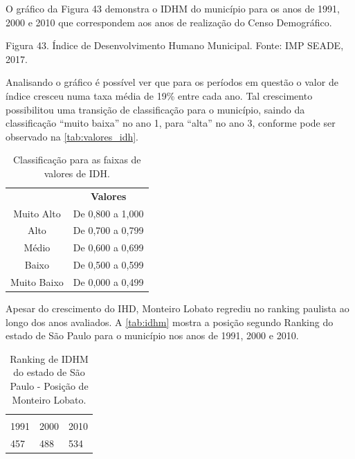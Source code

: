 O gráfico da Figura 43 demonstra o IDHM do município para os anos de 1991, 2000 e 2010 que correspondem aos anos de realização do Censo Demográfico.
 
Figura 43. Índice de Desenvolvimento Humano Municipal.
Fonte: IMP SEADE, 2017.

Analisando o gráfico é possível ver que para os períodos em questão o valor de índice cresceu numa taxa média de 19\% entre cada ano. Tal crescimento possibilitou uma transição de classificação para o município, saindo da classificação “muito baixa” no ano 1, para “alta” no ano 3, conforme pode ser observado na  \autoref{tab:valores_idh}.

\begin{center}
	\begin{table}[htbp]
	\centering
	\caption{Classificação para as faixas de valores de IDH.}
	\begin{tabular}{c|c}
		\rowcolor[rgb]{ .969,  .588,  .275} \multicolumn{1}{c}{\textcolor[rgb]{ 1,  1,  1}{\textbf{Faixas}}} & \textcolor[rgb]{ 1,  1,  1}{\textbf{Valores}} \\
		\rowcolor[rgb]{ .992,  .914,  .851} Muito Alto & De 0,800 a 1,000 \\
		\rowcolor[rgb]{ .984,  .831,  .706} Alto  & De 0,700 a 0,799 \\
		\rowcolor[rgb]{ .992,  .914,  .851} Médio & De 0,600 a 0,699 \\
		\rowcolor[rgb]{ .984,  .831,  .706} Baixo & De 0,500 a 0,599 \\
		\rowcolor[rgb]{ .992,  .914,  .851} Muito Baixo & De 0,000 a 0,499 \\
	\end{tabular}%
	\label{tab:valores_idh}%
\end{table}%
\end{center}

Apesar do crescimento do IHD, Monteiro Lobato regrediu no ranking paulista ao longo dos anos avaliados. A \autoref{tab:idhm} mostra a posição segundo Ranking do estado de São Paulo para o município nos anos de 1991, 2000 e 2010.
 
\begin{table}[htbp]
	\centering
	\caption{Ranking de IDHM do estado de São Paulo - Posição de Monteiro Lobato.}
	\begin{tabular}{P{1,5cm}|P{1,5cm}|P{1,5cm}}
		 \\
		 1991  & 2000  & 2010 \\
		 457   & 488   & 534 \\
	\end{tabular}%
	\label{tab:idhm}%
\end{table}%

